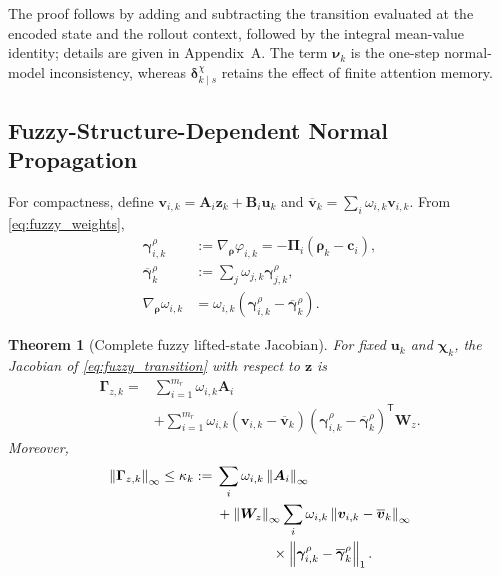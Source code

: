 \documentclass[journal]{IEEEtran}
\newtheorem{theorem}{Theorem}
\newcommand{\norm}[1]{\left\lVert #1\right\rVert}
\newcommand{\T}{\mathsf T}
\newcommand{\1}{\bm 1}
\begin{document}
The proof follows by adding and subtracting the transition evaluated at the
encoded state and the rollout context, followed by the integral mean-value
identity; details are given in Appendix~A. The term $\bm\nu_k$ is the
one-step normal-model inconsistency, whereas
$\bm\delta_{k\mid s}^{\chi}$ retains the effect of finite attention memory.

\subsection{Fuzzy-Structure-Dependent Normal Propagation}
For compactness, define
$\bm v_{i,k}=\bm A_i\bm z_k+\bm B_i\bm u_k$ and
$\overline{\bm v}_k=\sum_i\omega_{i,k}\bm v_{i,k}$. From
\eqref{eq:fuzzy_weights},
\begin{equation}
\begin{aligned}
\bm\gamma_{i,k}^{\rho}
&:=\nabla_{\bm\rho}\varphi_{i,k}
=-\bm\Pi_i(\bm\rho_k-\bm c_i),\\
\overline{\bm\gamma}_k^{\rho}
&:=\sum_j\omega_{j,k}\bm\gamma_{j,k}^{\rho},\\
\nabla_{\bm\rho}\omega_{i,k}
&=\omega_{i,k}
(\bm\gamma_{i,k}^{\rho}-\overline{\bm\gamma}_k^{\rho}).
\end{aligned}
\label{eq:weight_gradient}
\end{equation}

\begin{theorem}[Complete fuzzy lifted-state Jacobian]
\label{thm:jacobian}
For fixed $\bm u_k$ and $\bm\chi_k$, the Jacobian of
\eqref{eq:fuzzy_transition} with respect to $\bm z$ is
\begin{equation}
\begin{aligned}
\bm\Gamma_{z,k}
={}&\sum_{i=1}^{m_r}\omega_{i,k}\bm A_i\\
&+\sum_{i=1}^{m_r}\omega_{i,k}
(\bm v_{i,k}-\overline{\bm v}_k)
(\bm\gamma_{i,k}^{\rho}
-\overline{\bm\gamma}_k^{\rho})^\T\bm W_z .
\end{aligned}
\label{eq:complete_jacobian}
\end{equation}
Moreover,
\begin{equation}
\begin{aligned}
\norm{\bm\Gamma_{z,k}}_\infty\leq\kappa_k:={}&
\sum_i\omega_{i,k}\norm{\bm A_i}_\infty\\
&+\norm{\bm W_z}_\infty
\sum_i\omega_{i,k}
\norm{\bm v_{i,k}-\overline{\bm v}_k}_\infty\\
&\hspace{14mm}\times
\norm{\bm\gamma_{i,k}^{\rho}
-\overline{\bm\gamma}_k^{\rho}}_1 .
\end{aligned}
\label{eq:jacobian_bound}
\end{equation}
\end{theorem}
\end{document}
